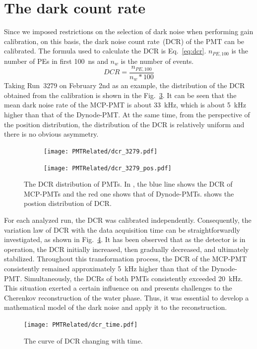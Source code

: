 \section{The dark count rate}
\label{sec:dcr}
Since we imposed restrictions on the selection of dark noise when performing gain calibration, on this basis, the dark noise count rate~(DCR) of the PMT can be calibrated. The formula used to calculate the DCR is Eq.~\eqref{eq:dcr}. $n_{PE,100}$ is the number of PEs in first \SI{100}{ns} and $n_w$ is the number of events.
\begin{equation}
	DCR=\frac{n_{PE,100}}{n_w*100}
	\label{eq:dcr}
\end{equation}
Taking Run~3279 on February 2nd as an example, the distribution of the DCR obtained from the calibration is shown in the Fig.~\ref{fig:dcr_calib}. It can be seen that the mean dark noise rate of the MCP-PMT is about \SI{33}{kHz}, which is about \SI{5}{kHz} higher than that of the Dynode-PMT. At the same time, from the perspective of the position distribution, the distribution of the DCR is relatively uniform and there is no obvious asymmetry.
\begin{figure}[htbp]
	\centering
	\begin{subfigure}{0.6\textwidth}
		\centering
		\texttt{[image: PMTRelated/dcr\_3279.pdf]}
		\caption{}
		\label{fig:dcr}
	\end{subfigure}%
	\hfill
	\begin{subfigure}{\textwidth}
		\centering
		\texttt{[image: PMTRelated/dcr\_3279\_pos.pdf]}
		\caption{}
		\label{fig:dcrpos}
	\end{subfigure}
	\caption{The DCR distribution of PMTs. In , the blue line shows the DCR of MCP-PMTs and the red one shows that of Dynode-PMTs.  shows the postion distribution of DCR.}
	\label{fig:dcr_calib}
\end{figure}
For each analyzed run, the DCR was calibrated independently. Consequently, the variation law of DCR with the data acquisition time can be straightforwardly investigated, as shown in Fig.~\ref{fig:dcr_time}. It has been observed that as the detector is in operation, the DCR initially increased, then gradually decreased, and ultimately stabilized. Throughout this transformation process, the DCR of the MCP-PMT consistently remained approximately \SI{5}{kHz} higher than that of the Dynode-PMT. Simultaneously, the DCRs of both PMTs consistently exceeded \SI{20}{kHz}. This situation exerted a certain influence on and presents challenges to the Cherenkov reconstruction of the water phase. Thus, it was essential to develop a mathematical model of the dark noise and apply it to the reconstruction.
\begin{figure}[htbp]
	\centering
	\texttt{[image: PMTRelated/dcr\_time.pdf]}
	\caption{The curve of DCR changing with time.}
	\label{fig:dcr_time}
\end{figure}

